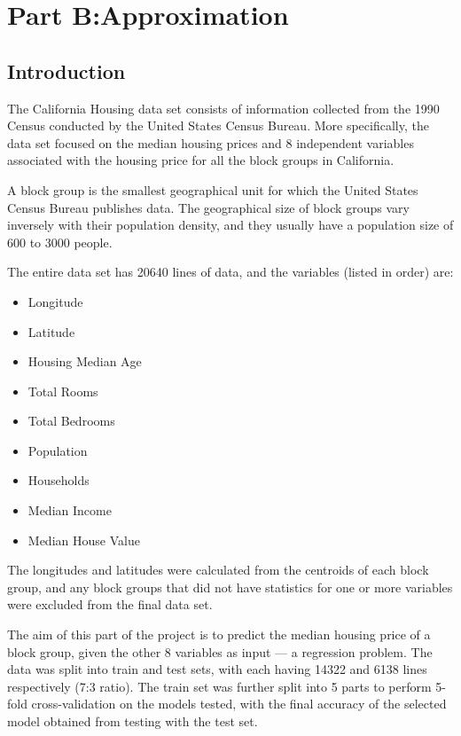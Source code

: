 \chapter*{Part B:\@ Approximation}

\section*{Introduction}

The California Housing data set consists of information collected from
the 1990 Census conducted by the United States Census Bureau. More
specifically, the data set focused on the median housing prices and 8
independent variables associated with the housing price for all the
block groups in California.

A block group is the smallest geographical unit for which the United
States Census Bureau publishes data. The geographical size of block
groups vary inversely with their population density, and they usually
have a population size of 600 to 3000 people. 

The entire data set has 20640 lines of data, and the variables
(listed in order) are:

\begin{itemize}
    \item Longitude
    \item Latitude
    \item Housing Median Age 
    \item Total Rooms
    \item Total Bedrooms
    \item Population
    \item Households
    \item Median Income
    \item Median House Value
\end{itemize}

The longitudes and latitudes were calculated from the centroids of each
block group, and any block groups that did not have statistics for one
or more variables were excluded from the final data set.

The aim of this part of the project is to predict the median housing price
of a block group, given the other 8 variables as input --- a regression
problem. The data was split into train and test sets, with each having 14322
and 6138 lines respectively (7:3 ratio). The train set was further split
into 5 parts to perform 5-fold cross-validation on the models tested, with
the final accuracy of the selected model obtained from testing with the
test set.

